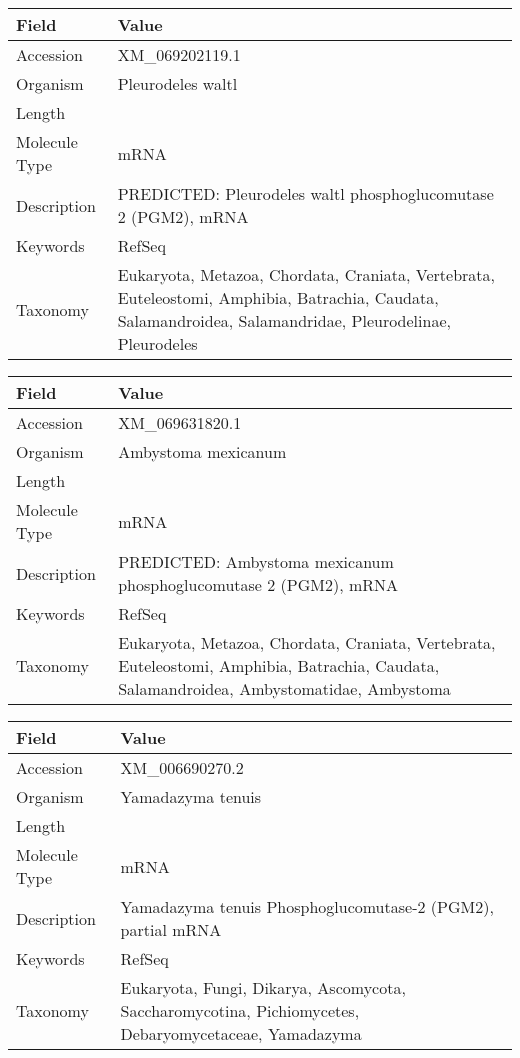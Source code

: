 \documentclass[10pt]{article}
\begin{document}
{\footnotesize
\begin{longtable}{>{\raggedright\arraybackslash}p{4.5cm} >{\raggedright\arraybackslash}p{11.5cm}}
\textbf{Field} & \textbf{Value} \\
\hline
Accession & XM\_069202119.1 \\
Organism & Pleurodeles waltl \\
Length & 2344 \\
Molecule Type & mRNA \\
Description & PREDICTED: Pleurodeles waltl phosphoglucomutase 2 (PGM2), mRNA \\
Keywords & RefSeq \\
Taxonomy & Eukaryota, Metazoa, Chordata, Craniata, Vertebrata, Euteleostomi, Amphibia, Batrachia, Caudata, Salamandroidea, Salamandridae, Pleurodelinae, Pleurodeles \\
\end{longtable}
}

{\footnotesize
\begin{longtable}{>{\raggedright\arraybackslash}p{4.5cm} >{\raggedright\arraybackslash}p{11.5cm}}
\textbf{Field} & \textbf{Value} \\
\hline
Accession & XM\_069631820.1 \\
Organism & Ambystoma mexicanum \\
Length & 3639 \\
Molecule Type & mRNA \\
Description & PREDICTED: Ambystoma mexicanum phosphoglucomutase 2 (PGM2), mRNA \\
Keywords & RefSeq \\
Taxonomy & Eukaryota, Metazoa, Chordata, Craniata, Vertebrata, Euteleostomi, Amphibia, Batrachia, Caudata, Salamandroidea, Ambystomatidae, Ambystoma \\
\end{longtable}
}

{\footnotesize
\begin{longtable}{>{\raggedright\arraybackslash}p{4.5cm} >{\raggedright\arraybackslash}p{11.5cm}}
\textbf{Field} & \textbf{Value} \\
\hline
Accession & XM\_006690270.2 \\
Organism & Yamadazyma tenuis \\
Length & 2955 \\
Molecule Type & mRNA \\
Description & Yamadazyma tenuis Phosphoglucomutase-2 (PGM2), partial mRNA \\
Keywords & RefSeq \\
Taxonomy & Eukaryota, Fungi, Dikarya, Ascomycota, Saccharomycotina, Pichiomycetes, Debaryomycetaceae, Yamadazyma \\
\end{longtable}
}
\end{document}
